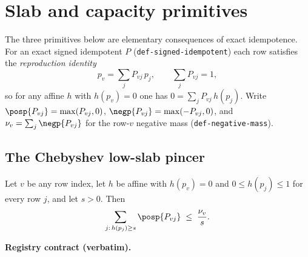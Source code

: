 \section{Slab and capacity primitives}\label{sec:slab-capacity-primitives}

The three primitives below are elementary consequences of exact idempotence. For an exact signed
idempotent $P$ (\texttt{def-signed-idempotent}) each row satisfies the \emph{reproduction identity}
\begin{equation}\label{eq:scp-repro}
  p_v=\sum_j P_{vj}\,p_j,\qquad \sum_j P_{vj}=1,
\end{equation}
so for any affine $h$ with $h(p_v)=0$ one has $0=\sum_j P_{vj}\,h(p_j)$. Write
$\posp{P_{vj}}=\max(P_{vj},0)$, $\negp{P_{vj}}=\max(-P_{vj},0)$, and $\nu_v=\sum_j\negp{P_{vj}}$ for the
row-$v$ negative mass (\texttt{def-negative-mass}).

\subsection{The Chebyshev low-slab pincer}

\begin{lemma}\label{lem:cs-low-slab-pincer}
Let $v$ be any row index, let $h$ be affine with $h(p_v)=0$ and $0\le h(p_j)\le1$ for every row $j$,
and let $s>0$. Then
\begin{equation}\label{eq:scp-pincer}
  \sum_{j:\,h(p_j)\ge s}\posp{P_{vj}}\;\le\;\frac{\nu_v}{s}.
\end{equation}
\end{lemma}

\noindent\textbf{Registry contract (verbatim).}

